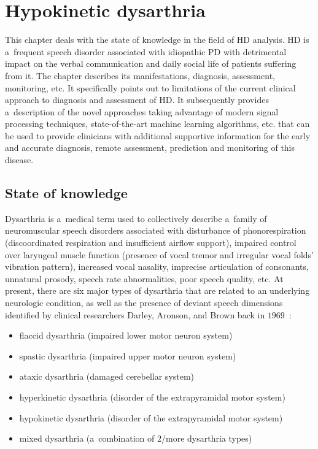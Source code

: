 \chapter[Hypokinetic dysarthria]{Hypokinetic dysarthria}
\label{ch2}
This chapter deals with the state of knowledge in the field of HD analysis. HD is a~frequent speech disorder associated with idiopathic PD with detrimental impact on the verbal communication and daily social life of patients suffering from it. The chapter describes its manifestations, diagnosis, assessment, monitoring, etc. It specifically points out to limitations of the current clinical approach to diagnosis and assessment of HD. It subsequently provides a~description of the novel approaches taking advantage of modern signal processing techniques, state-of-the-art machine learning algorithms, etc. that can be used to provide clinicians with additional supportive information for the early and accurate diagnosis, remote assessment, prediction and monitoring of this disease.

\section{State of knowledge}
\label{ch2_1}

Dysarthria is a~medical term used to collectively describe a~family of neuromuscular speech disorders associated with disturbance of phonorespiration (discoordinated respiration and insufficient airflow support), impaired control over laryngeal muscle function (presence of vocal tremor and irregular vocal folds' vibration pattern), increased vocal nasality, imprecise articulation of consonants, unnatural prosody, speech rate abnormalities, poor speech quality, etc. At present, there are six major types of dysarthria \cite{Mcneil1997, Murdoch1998, Kent2000, Rusz2014} that are related to an underlying neurologic condition, as well as the presence of deviant speech dimensions identified by clinical researchers Darley, Aronson, and Brown back in $1969$~\cite{Darley1969b}:
\begin{itemize}
	\item flaccid dysarthria (impaired lower motor neuron system)
	\item spastic dysarthria (impaired upper motor neuron system)
	\item ataxic dysarthria (damaged cerebellar system)
	\item hyperkinetic dysarthria (disorder of the extrapyramidal motor system)
	\item hypokinetic dysarthria (disorder of the extrapyramidal motor system)
	\item mixed dysarthria (a~combination of $2$/more dysarthria types)
\end{itemize}

